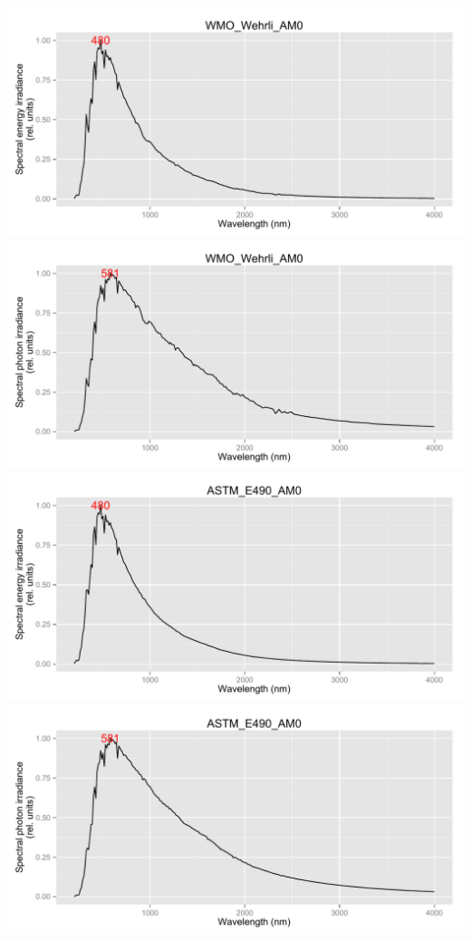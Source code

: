 \documentclass{article}\usepackage[]{graphicx}\usepackage[]{color}
\newenvironment{knitrout}{}{} %
\begin{document}
\begin{knitrout}
{\centering \includegraphics[width=.95\textwidth]{figure/pos-extraterrestrial1} 
\includegraphics[width=.95\textwidth]{figure/pos-extraterrestrial2} 
\includegraphics[width=.95\textwidth]{figure/pos-extraterrestrial3} 
\includegraphics[width=.95\textwidth]{figure/pos-extraterrestrial4} 
}
\end{knitrout}
\end{document}
